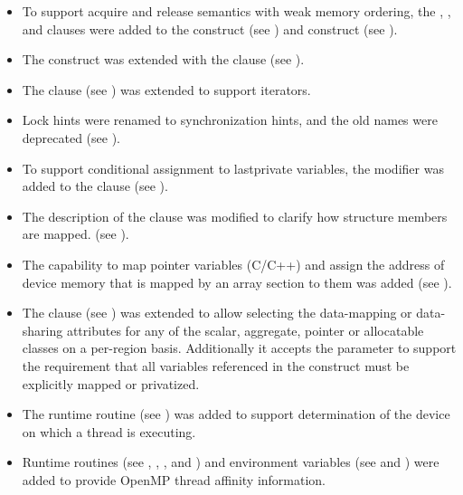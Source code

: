 \begin{itemize}
\item To support acquire and release semantics with weak memory ordering, the
      , , and  clauses were added to
      the  construct (see ) and
       construct (see ).

\item The  construct was extended with the  clause
      (see ).

\item The  clause (see ) was
      extended to support iterators.

\item Lock hints were renamed to synchronization hints, and the
      old names were deprecated (see ).

\item To support conditional assignment to lastprivate variables, the
       modifier was added to the 
      clause (see ).

\item The description of the  clause was modified to clarify how
      structure members are mapped. (see ).

\item The capability to map pointer variables (C/C++) and assign the
      address of device memory that is mapped by an array section to them
      was added (see ).

\item The  clause (see )
      was extended to allow selecting the data-mapping or data-sharing attributes for
      any of the scalar, aggregate, pointer or allocatable classes on a
      per-region basis. Additionally it accepts the  parameter to support the
      requirement that all variables referenced in the
      construct must be explicitly mapped or privatized.

\item The  runtime routine
      (see ) was added to support
      determination of the device on which a thread is executing.

\item Runtime routines (see ,
      ,
      , and
      ) and environment variables
      (see  and
      ) were added to provide OpenMP
      thread affinity information.


\end{itemize}
